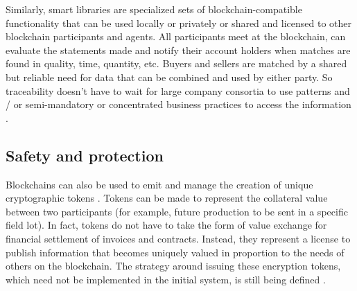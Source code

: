 Similarly, smart libraries are specialized sets of blockchain-compatible functionality that can be used locally or privately or shared and licensed to other blockchain participants and agents. All participants meet at the blockchain, can evaluate the statements made and notify their account holders when matches are found in quality, time, quantity, etc. Buyers and sellers are matched by a shared but reliable need for data that can be combined and used by either party. So traceability doesn't have to wait for large company consortia to use patterns and / or semi-mandatory or concentrated business practices to access the information \cite{galvez2018future}.

\subsection{Safety and protection}\label{sec:Safety}
Blockchains can also be used to emit and manage the creation of unique cryptographic tokens \cite{nystrom1999pkcs}. Tokens can be made to represent the collateral value between two participants (for example, future production to be sent in a specific field lot). In fact, tokens do not have to take the form of value exchange for financial settlement of invoices and contracts. Instead, they represent a license to publish information that becomes uniquely valued in proportion to the needs of others on the blockchain. The strategy around issuing these encryption tokens, which need not be implemented in the initial system, is still being defined \cite{galvez2018future}.